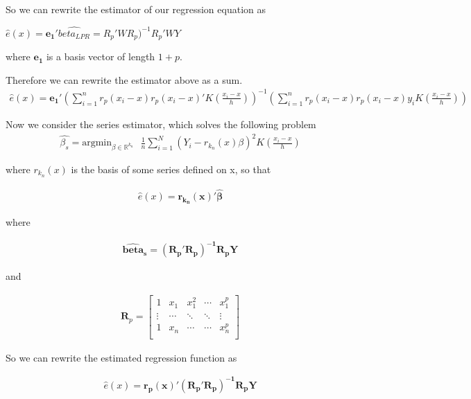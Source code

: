 \documentclass[12pt]{article}
\newcommand{\R}{\mathbb{R}}
\begin{document}
So we can rewrite the estimator of our regression equation as

$\hat{e}(x) = \mathbf{e_1'}\hat{beta_{LPR}} = R_p' W R_p)^{-1} R_p'WY$

where $\mathbf{e_1}$ is a basis vector of length $1+p$.

Therefore we can rewrite the estimator above as a sum.
\begin{gather*}
\hat{e}(x) = \mathbf{e_1'}\left(\sum\limits_{i=1}^n r_p(x_i-x)r_p(x_i-x)'K\left(\frac{x_i - x}{h}\right)\right)^{-1} \left( \sum\limits_{i=1}^n r_p(x_i-x)r_p(x_i-x)y_iK\left(\frac{x_i - x}{h}\right) \right)
\end{gather*}







Now we consider the series estimator, which solves the following problem
\begin{gather*}
\hat{\beta_s} =  \text{argmin}_{\beta \in \R^{k_n}} \text{    } \frac{1}{n}\sum\limits_{i=1}^N \left(Y_i - r_{k_n}(x)\beta  \right)^2 K(\frac{x_i - x}{h})
\end{gather*}

where $r_{k_n}(x)$ is the basis of some series defined on x, so that

\begin{gather*}
\hat{e}(x) = \mathbf{r_{k_n}(x)'\hat{\beta}}
\end{gather*}

where

\begin{gather*}
\mathbf{\hat{beta}_s} = \mathbf{\left( R_p'R_p \right)^{-1}R_pY}
\end{gather*}

and

\begin{gather*}
\mathbf{R}_p = \begin{bmatrix}
1 & x_1 & x_1^2 & \cdots & x_1^p \\
\vdots & \cdots & \ddots & \ddots & \vdots \\
1 & x_n & \cdots & \cdots & x_n^p \\
\end{bmatrix}
\end{gather*}

So we can rewrite the estimated regression function as

\begin{gather*}
\hat{e}(x) = \mathbf{r_p(x)'\left( R_p'R_p \right)^{-1}R_pY}
\end{gather*}
\end{document}
